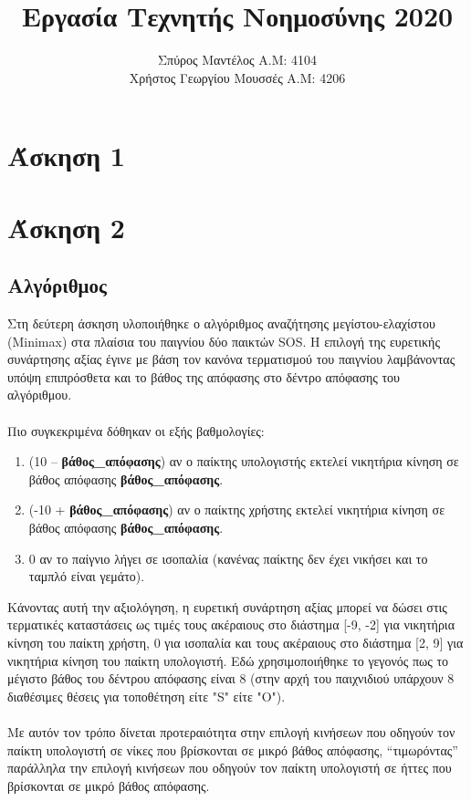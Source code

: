 \documentclass{article}
\title{Εργασία Τεχνητής Νοημοσύνης 2020}
\author{Σπύρος Μαντέλος Α.Μ: 4104\\Χρήστος Γεωργίου Μουσσές Α.Μ: 4206}
\date{}
\begin{document}
\maketitle

\section{Άσκηση 1}

\section{Άσκηση 2}

\subsection{Αλγόριθμος}
Στη δεύτερη άσκηση υλοποιήθηκε ο αλγόριθμος αναζήτησης μεγίστου-ελαχίστου (Minimax) στα πλαίσια του παιγνίου δύο παικτών SOS. Η επιλογή της ευρετικής συνάρτησης αξίας έγινε με βάση τον κανόνα τερματισμού του παιγνίου λαμβάνοντας υπόψη επιπρόσθετα και το βάθος της απόφασης στο δέντρο απόφασης του αλγόριθμου.\\\\
Πιο συγκεκριμένα δόθηκαν οι εξής βαθμολογίες:
\begin{enumerate}
    \item (10 – \textbf{βάθος\_απόφασης}) αν ο παίκτης υπολογιστής εκτελεί νικητήρια κίνηση σε βάθος απόφασης \textbf{βάθος\_απόφασης}.
    \item (-10 + \textbf{βάθος\_απόφασης}) αν ο παίκτης χρήστης εκτελεί νικητήρια κίνηση σε βάθος απόφασης \textbf{βάθος\_απόφασης}.
    \item 0 αν το παίγνιο λήγει σε ισοπαλία (κανένας παίκτης δεν έχει νικήσει και το ταμπλό είναι γεμάτο).
\end{enumerate}
Κάνοντας αυτή την αξιολόγηση, η ευρετική συνάρτηση αξίας μπορεί να δώσει στις τερματικές καταστάσεις ως τιμές τους ακέραιους στο διάστημα
[-9, -2] για νικητήρια κίνηση του παίκτη χρήστη, 0 για ισοπαλία και τους ακέραιους στο διάστημα [2, 9] για
νικητήρια κίνηση του παίκτη υπολογιστή. Εδώ χρησιμοποιήθηκε το γεγονός πως το μέγιστο βάθος του δέντρου
απόφασης είναι 8 (στην αρχή του παιχνιδιού υπάρχουν 8 διαθέσιμες θέσεις
για τοποθέτηση είτε "S" είτε "O").\\\\
Με αυτόν τον τρόπο δίνεται προτεραιότητα στην επιλογή κινήσεων που οδηγούν τον παίκτη υπολογιστή σε νίκες που βρίσκονται σε μικρό βάθος απόφασης, “τιμωρόντας” παράλληλα την επιλογή
κινήσεων που οδηγούν τον παίκτη υπολογιστή σε ήττες που βρίσκονται σε μικρό βάθος απόφασης.
\end{document}
